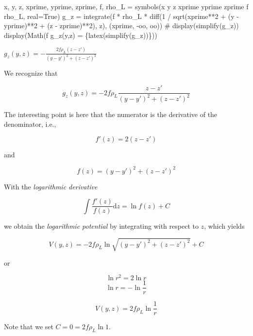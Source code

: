 \documentclass[
  a4paper,
  DIV=11,
  numbers=noendperiod]{scrreprt}
\newenvironment{Shaded}{\begin{snugshade}}{\end{snugshade}}
\newcommand{\CommentTok}[1]{\textcolor[rgb]{0.37,0.37,0.37}{#1}}
\newcommand{\DecValTok}[1]{\textcolor[rgb]{0.68,0.00,0.00}{#1}}
\newcommand{\NormalTok}[1]{\textcolor[rgb]{0.00,0.23,0.31}{#1}}
\newcommand{\OperatorTok}[1]{\textcolor[rgb]{0.37,0.37,0.37}{#1}}
\newcommand{\SpecialCharTok}[1]{\textcolor[rgb]{0.37,0.37,0.37}{#1}}
\newcommand{\SpecialStringTok}[1]{\textcolor[rgb]{0.13,0.47,0.30}{#1}}
\newcommand{\StringTok}[1]{\textcolor[rgb]{0.13,0.47,0.30}{#1}}
\newcommand{\VariableTok}[1]{\textcolor[rgb]{0.07,0.07,0.07}{#1}}
\begin{document}
\begin{Shaded}
\begin{Highlighting}[]
\NormalTok{x, y, z, xprime, yprime, zprime, f, rho\_L }\OperatorTok{=}\NormalTok{ symbols(}\StringTok{\textquotesingle{}x y z xprime yprime zprime f rho\_L\textquotesingle{}}\NormalTok{, real}\OperatorTok{=}\VariableTok{True}\NormalTok{)}
\NormalTok{g\_z }\OperatorTok{=}\NormalTok{ integrate(f }\OperatorTok{*}\NormalTok{ rho\_L }\OperatorTok{*}\NormalTok{ diff(}\DecValTok{1} \OperatorTok{/}\NormalTok{ sqrt(xprime}\OperatorTok{**}\DecValTok{2} \OperatorTok{+}\NormalTok{ (y }\OperatorTok{{-}}\NormalTok{ yprime)}\OperatorTok{**}\DecValTok{2} \OperatorTok{+}\NormalTok{ (z }\OperatorTok{{-}}\NormalTok{ zprime)}\OperatorTok{**}\DecValTok{2}\NormalTok{), z), (xprime, }\OperatorTok{{-}}\NormalTok{oo, oo))}
\CommentTok{\# display(simplify(g\_z))}
\NormalTok{display(Math(}\SpecialStringTok{f\textquotesingle{} g\_z(y,z) = }\SpecialCharTok{\{}\NormalTok{latex(simplify(g\_z))}\SpecialCharTok{\}}\SpecialStringTok{\textquotesingle{}}\NormalTok{))}
\end{Highlighting}
\end{Shaded}

$\displaystyle  g_z(y,z) = - \frac{2 f \rho_{L} \left(z - {z}'\right)}{\left(y - {y}'\right)^{2} + \left(z - {z}'\right)^{2}}$

We recognize that

\[
g_z(y,z) = - 2 f \rho_L \frac{z - z'}{(y - y')^2 + (z - z')^2}
\]

The interesting point is here that the numerator is the derivative of
the denominator, i.e.,

\[
f'(z) = 2(z - z')
\]

and

\[
f(z) = (y - y')^2 + (z - z')^2
\]

With the \emph{logarithmic derivative}

\[
\int \frac{f'(z)}{f(z)} \mathrm dz = \ln f(z) + C
\]

we obtain the \emph{logarithmic potential} by integrating with respect
to \(z\), which yields

\[
V(y,z) = -2 f \rho_L \ln \sqrt{(y - y')^2 + (z - z')^2} + C
\]

or

\[ \ln r^2 = 2 \ln r \] \[ \ln r = -\ln \frac{1}{r} \]

\[
V(y,z) = 2 f \rho_L \ln \frac{1}{r}
\]

Note that we set \(C = 0 = 2 f \rho_L \ln 1\).
\end{document}
